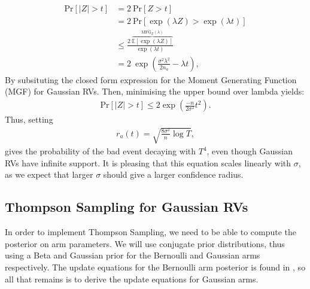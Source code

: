 \documentclass[a4paper]{article}
\begin{document}
	\begin{align}
	\text{Pr}[|Z| > t] &= 2\ \text{Pr}[Z > t] \tag*{(Symmetry)} \\
	&= 2\ \text{Pr}[\exp(\lambda Z) > \exp(\lambda t)] \tag*{(For $\lambda > 0$)} \\
	&\leq \frac{2\  \overbrace{\mathbb{E}[\exp(\lambda Z)]}^{\text{MFG}_Z(\lambda)}}{\exp(\lambda t)} \tag*{(Markov's Inequality)} \\
	&= 2\ \exp(\frac{\sigma^2 \lambda^2}{2 n_a} - \lambda t),
	\end{align}
	By subsituting the closed form expression for the Moment Generating Function (MGF) for Gaussian RVs. Then, minimising the upper bound over lambda yields:
	\begin{align}
	\text{Pr}[|Z| > t] \leq 2 \exp(\frac{-n}{2\sigma^2} t^2).
	\end{align}
	Thus, setting
	\begin{align}
	r_a(t) = \sqrt{\frac{8 \sigma^2}{n} \log T},
	\end{align}
	gives the probability of the bad event decaying with $T^4$, even though Gaussian RVs have infinite support. It is pleasing that this equation scales linearly with $\sigma$, as we expect that larger $\sigma$ should give a larger confidence radius. 
	
	\subsection{Thompson Sampling for Gaussian RVs}
	In order to implement Thompson Sampling, we need to be able to compute the posterior on arm parameters. We will use conjugate prior distributions, thus using a Beta and Gaussian prior for the Bernoulli and Gaussian arms respectively. The update equations for the Bernoulli arm posterior is found in \cite{thompson}, so all that remains is to derive the update equations for Gaussian arms.
	
\end{document}

